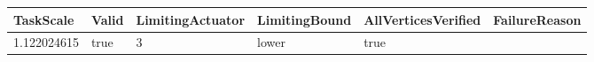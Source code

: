 \begin{tabular}{@{}llllll@{}}
\toprule
TaskScale & Valid & LimitingActuator & LimitingBound & AllVerticesVerified & FailureReason \\
\midrule
1.122024615 & true & 3 & lower & true &  \\
\bottomrule
\end{tabular}

